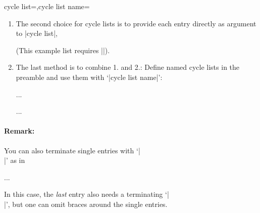 \begin{pgfplotskeylist}{cycle list=,cycle list name=}
\begin{enumerate}
	\item The second choice for cycle lists is to provide each entry directly as argument to |cycle list|,
\begin{codeexample}[]
\end{codeexample}
	(This example list requires |\usetikzlibrary{plotmarks}|).
	\item The last method is to combine 1. and 2.:  Define named cycle lists in the preamble and use them with `|cycle list name|':
\begin{codeexample}
...
\begin{axis}[cycle list name=mylist]
	...
\end{axis}
\end{codeexample}
\end{enumerate}

\paragraph{Remark:} You can also terminate single entries with `|\\|' as in
\begin{codeexample}
\begin{axis}[cycle list={%
	blue,mark=*\\%
	red,mark=square\\%
	dashed,mark=o\\%
	loosely dotted,mark=+\\%
	brown!60!black,
		mark options={fill=brown!40},
		mark=otimes*\\}
]
...
\end{axis}
\end{codeexample}
In this case, the \emph{last} entry also needs a terminating `|\\|', but one can omit braces around the single entries.
\end{pgfplotskeylist}

